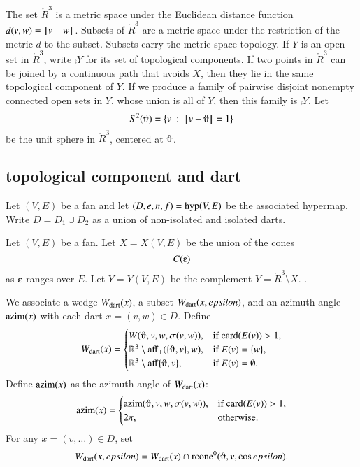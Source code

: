 The set $\ring{R}^3$ is a metric space under the
Euclidean distance function $d(v,w) = {\hskip0.1em|\hskip-0.15em|\hskip0.1em}v - w{\hskip0.1em|\hskip-0.15em|\hskip0.1em}$.  Subsets of
$\ring{R}^3$ are a metric space under the restriction of the metric
$d$ to the subset. Subsets carry the metric space topology. 
If $Y$ is an open set in $\ring{R}^3$, write
$\comp{Y}$ for its set of topological components.
If two
points in $\ring{R}^3$ 
can be joined by a continuous path that avoids $X$,
then they lie in the same topological component of $Y$.
If we produce a family of pairwise disjoint nonempty connected open sets in
$Y$, whose union is all of $Y$, then
this family is $\comp{Y}$.
Let $$S^2(\orgn) = \{ v \mid \norm{ v}{\orgn } = 1\}$$ be the unit sphere in
$\ring{R}^3$, centered at $\orgn$.  






\subsection{topological component and dart}

Let $(V,E)$ be a fan and let $(D,e,n,f) = {\operatorname{hyp}}(V,E)$
be the associated hypermap.  Write $D = D_1\cup D_2$ as a union of
non-isolated and isolated darts.

\begin{definition}[X,~Y]\label{def:XY}
Let $(V,E)$ be a fan.  Let $X=X(V,E)$ be the union of the
cones
   $$C(\e)$$
as $\e$ ranges over $E$.  Let $Y=Y(V,E)$ be the complement
$Y = \ring{R}^3\setminus X$.
.
\end{definition}


We associate a wedge $W_{\text{dart}}(x)$, a subset $W_{\text{dart}}(x,epsilon)$,
and an azimuth angle ${\operatorname{azim}}(x)$
with each dart $x=(v,w)\in D$.  Define 
$$
\Wdart(x)=
\begin{cases} 
W(\orgn,v,w,\sigma(v,w)),&\text{if }\card(E(v))>1,\\
\ring{R}^3\setminus \op{aff}_+(\{\orgn,v\},w),&\text{if } E(v) = \{w\},\\
\ring{R}^3\setminus \op{aff}\{\orgn,v\},&\text{if } E(v) = \emptyset.\\
\end{cases}
$$
Define ${\operatorname{azim}}(x)$ as the azimuth angle of $W_{\text{dart}}(x)$:
$$
\op{azim}(x)=\begin{cases}
\op{azim}(\orgn,v,w,\sigma(v,w)), &\text{if } \card(E(v)) > 1,\\
2\pi, & \text{otherwise.}\\
\end{cases}
$$
For any $x = (v,\ldots)\in D$, set
    $$
    \Wdart(x,\epsilon) = \Wdart(x) \cap \op{rcone}^0(\orgn,v,\cos\epsilon).
    $$

